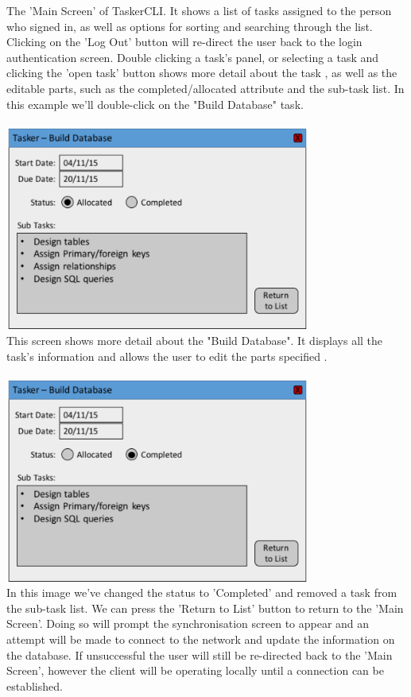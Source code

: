 \documentclass{project}
\begin{document}
The 'Main Screen' of TaskerCLI. It shows a list of tasks assigned to the person who signed in, as well as options for sorting and searching through the list. Clicking on the 'Log Out' button will re-direct the user back to the login authentication screen. Double clicking a task's panel, or selecting a task and clicking the 'open task' button shows more detail about the task \cite{se.qa.rs fr10}, as well as the editable parts, such as the completed/allocated attribute and the sub-task list. In this example we'll double-click on the "Build Database" task. \\~\\
\newline
\includegraphics[width=0.75\textwidth, center]{images/5.2/TaskerCLITaskInfo} \\
This screen shows more detail about the "Build Database". It displays all the task's information and allows the user to edit the parts specified \cite{se.qa.rs fr10}. \\~\\
\newline
\includegraphics[width=0.75\textwidth, center]{images/5.2/TaskerCLITaskUpdated} \\
In this image we've changed the status to 'Completed' and removed a task from the sub-task list. We can press the 'Return to List' button to return to the 'Main Screen'. Doing so will prompt the synchronisation screen to appear and an attempt will be made to connect to the network and update the information on the database. If unsuccessful the user will still be re-directed back to the 'Main Screen', however the client will be operating locally until a connection can be established.\\~\\
\end{document}
